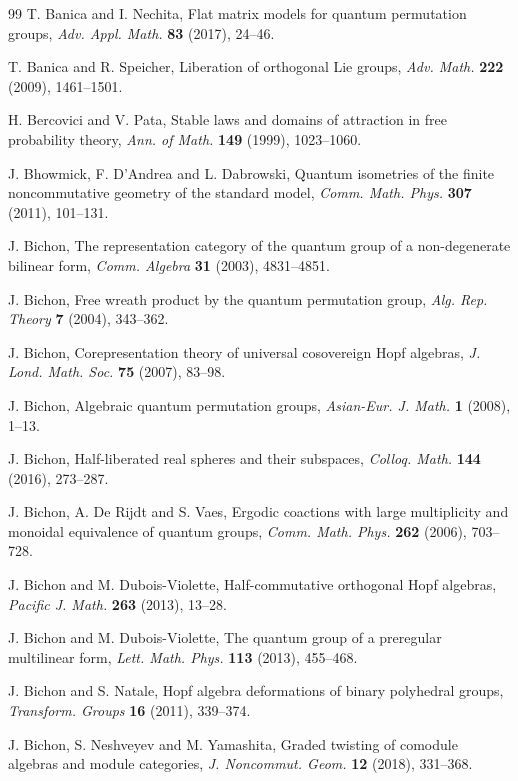 \documentclass[12pt]{amsbook}
\begin{document}
\begin{thebibliography}{99}
T. Banica and I. Nechita, Flat matrix models for quantum permutation groups, {\em Adv. Appl. Math.} {\bf 83} (2017), 24--46.

T. Banica and R. Speicher, Liberation of orthogonal Lie groups, {\em Adv. Math.} {\bf 222} (2009), 1461--1501.

H. Bercovici and V. Pata, Stable laws and domains of attraction in free probability theory, {\em Ann. of Math.} {\bf 149} (1999), 1023--1060.

J. Bhowmick, F. D'Andrea and L. Dabrowski, Quantum isometries of the finite noncommutative geometry of the standard model, {\em Comm. Math. Phys.} {\bf 307} (2011), 101--131.

J. Bichon,  The representation category of the quantum group of a non-degenerate bilinear form, {\em Comm. Algebra} {\bf 31} (2003), 4831--4851. 

J. Bichon, Free wreath product by the quantum permutation group, {\em Alg. Rep. Theory} {\bf 7} (2004), 343--362.

J. Bichon, Corepresentation theory of universal cosovereign Hopf algebras, {\em J. Lond. Math. Soc.} {\bf 75} (2007), 83--98. 

J. Bichon, Algebraic quantum permutation groups, {\em Asian-Eur. J. Math.} {\bf 1} (2008), 1--13.

J. Bichon, Half-liberated real spheres and their subspaces, {\em Colloq. Math.} {\bf 144} (2016), 273--287.

J. Bichon, A. De Rijdt and S. Vaes, Ergodic coactions with large multiplicity and monoidal equivalence of quantum groups, {\em Comm. Math. Phys.} {\bf 262} (2006), 703--728.

J. Bichon and M. Dubois-Violette, Half-commutative orthogonal Hopf algebras, {\em Pacific J. Math.} {\bf 263} (2013), 13--28. 

J. Bichon and M. Dubois-Violette, The quantum group of a preregular multilinear form, {\em Lett. Math. Phys.} {\bf 113} (2013), 455--468. 

J. Bichon and S. Natale, Hopf algebra deformations of binary polyhedral groups, {\em Transform. Groups} {\bf 16} (2011), 339--374.

J. Bichon, S. Neshveyev and M. Yamashita, Graded twisting of comodule algebras and module categories, {\em J. Noncommut. Geom.} {\bf 12} (2018), 331--368. 


\end{thebibliography}
\end{document}
